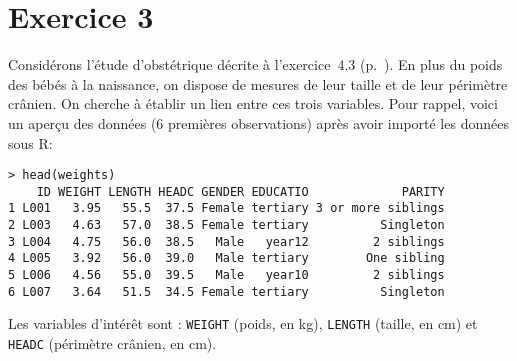 \documentclass[11pt]{report}
\theoremstyle{definition}
\newcommand{\R}{\textsf{R}\xspace}
\begin{document}
\section*{Exercice 3}
Considérons l'étude d'obstétrique décrite à l'exercice~4.3
(p.~\pageref{exo:4.3}). En plus du poids des bébés à la naissance, on
dispose de mesures de leur taille et de leur périmètre crânien. On cherche à
établir un lien entre ces trois variables. Pour rappel, voici un aperçu des
données (6 premières observations) après avoir importé les données sous \R :
\begin{verbatim}
> head(weights)
    ID WEIGHT LENGTH HEADC GENDER EDUCATIO             PARITY
1 L001   3.95   55.5  37.5 Female tertiary 3 or more siblings
2 L003   4.63   57.0  38.5 Female tertiary          Singleton
3 L004   4.75   56.0  38.5   Male   year12         2 siblings
4 L005   3.92   56.0  39.0   Male tertiary        One sibling
5 L006   4.56   55.0  39.5   Male   year10         2 siblings
6 L007   3.64   51.5  34.5 Female tertiary          Singleton
\end{verbatim}
Les variables d'intérêt sont : \texttt{WEIGHT} (poids, en kg),
\texttt{LENGTH} (taille, en cm) et \texttt{HEADC} (périmètre crânien, en
cm). 
\end{document}

